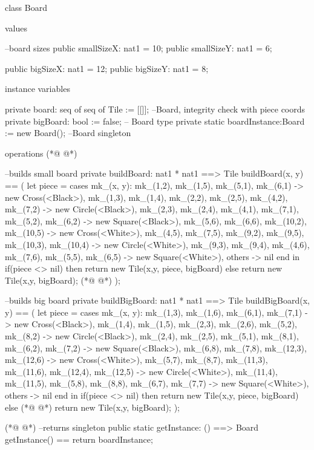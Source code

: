 \begin{vdmpp}[breaklines=true]
class Board

values
  
  --board sizes
  public smallSizeX: nat1 = 10;
  public smallSizeY: nat1 = 6;
  
  public bigSizeX: nat1 = 12;
  public bigSizeY: nat1 = 8;
  
instance variables

  private board: seq of seq of Tile := [[]]; --Board, integrity check with piece coords
  private bigBoard: bool := false; -- Board type
  private static boardInstance:Board := new Board(); --Board singleton

operations
(*@
\label{buildBoard:19}
@*)
  
  --builds small board
  private buildBoard: nat1 * nat1 ==> Tile
  buildBoard(x, y) == (
   let piece =
     cases mk_(x, y):
        mk_(1,2), mk_(1,5), mk_(5,1), mk_(6,1) -> new Cross(<Black>),
        mk_(1,3), mk_(1,4), mk_(2,2), mk_(2,5), mk_(4,2), mk_(7,2) -> new Circle(<Black>),
        mk_(2,3), mk_(2,4), mk_(4,1), mk_(7,1), mk_(5,2), mk_(6,2) -> new Square(<Black>),
        mk_(5,6), mk_(6,6), mk_(10,2), mk_(10,5) -> new Cross(<White>),
        mk_(4,5), mk_(7,5), mk_(9,2), mk_(9,5), mk_(10,3), mk_(10,4) -> new Circle(<White>),
        mk_(9,3), mk_(9,4), mk_(4,6), mk_(7,6), mk_(5,5), mk_(6,5) -> new Square(<White>),
        others -> nil
     end
   in  
    if(piece <> nil)
     then return new Tile(x,y, piece, bigBoard)
    else
     return new Tile(x,y, bigBoard);
(*@
\label{buildBigBoard:38}
@*)
  );
  
  --builds big board
  private buildBigBoard: nat1 * nat1 ==> Tile
  buildBigBoard(x, y) == (
   let piece =
     cases mk_(x, y):
        mk_(1,3), mk_(1,6), mk_(6,1), mk_(7,1) -> new Cross(<Black>),
        mk_(1,4), mk_(1,5), mk_(2,3), mk_(2,6), mk_(5,2), mk_(8,2) -> new Circle(<Black>),
        mk_(2,4), mk_(2,5), mk_(5,1), mk_(8,1), mk_(6,2), mk_(7,2) -> new Square(<Black>),
        mk_(6,8), mk_(7,8), mk_(12,3), mk_(12,6) -> new Cross(<White>),
        mk_(5,7), mk_(8,7), mk_(11,3), mk_(11,6), mk_(12,4), mk_(12,5) -> new Circle(<White>),
        mk_(11,4), mk_(11,5), mk_(5,8), mk_(8,8), mk_(6,7), mk_(7,7) -> new Square(<White>),
        others -> nil
     end
   in  
    if(piece <> nil)
     then return new Tile(x,y, piece, bigBoard)
    else
(*@
\label{getInstance:57}
@*)
     return new Tile(x,y, bigBoard);
  );
  
(*@
\label{setBoardType:60}
@*)
  --returns singleton
  public static getInstance: () ==> Board
  getInstance() == return boardInstance;
  

\end{vdmpp}
